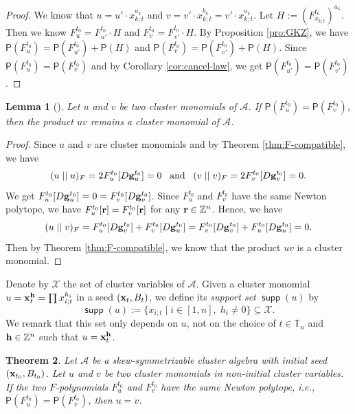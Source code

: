 \documentclass[10pt]{amsart}
\newtheorem{theorem}{Theorem}[section]
\newtheorem{lemma}[theorem]{Lemma}
\theoremstyle{definition}
\theoremstyle{remark}
\numberwithin{equation}{section}
\newcommand{\opname}[1]{\operatorname{\mathsf{#1}}}
\newcommand{\supp}{\opname{supp}}
\begin{document}
\begin{proof}
We know that $u=u'\cdot x_{k;t}^{a_k}$ and $v=v'\cdot x_{k;t}^{b_k}=v'\cdot x_{k;t}^{a_k}$. Let $H:=(F_{x_{k;t}}^{t_0})^{a_k}$. Then we know
 $F_u^{t_0}=F_{u'}^{t_0}\cdot H$ and $F_{v}^{t_0}=F_{v'}^{t_0}\cdot H$. By Proposition \ref{pro:GKZ}, we have $\mathsf P(F_u^{t_0})=\mathsf P(F_{u'}^{t_0})+\mathsf P(H)$ and $\mathsf P(F_{v}^{t_0})=\mathsf P(F_{v'}^{t_0})+\mathsf P(H)$. Since $\mathsf P(F_u^{t_0})=\mathsf P(F_{v}^{t_0})$ and by Corollary \ref{cor:cancel-law}, we get $\mathsf P(F_{u'}^{t_0})=\mathsf P(F_{v'}^{t_0})$.
\end{proof}


\begin{lemma}[{\cite[Corollary 4.21]{Cao-2023}}] \label{lem:uu1}
    Let $u$ and $v$ be two cluster monomials of $\mathcal A$.
  If $\mathsf P(F_u^{t_0})=\mathsf P(F_{v}^{t_0})$, then the product $uv$ remains a cluster monomial of $\mathcal A$.  
\end{lemma}

\begin{proof}
    Since $u$ and $v$ are cluster monomials and by Theorem \ref{thm:F-compatible}, we have
\[
(u\mid\mid u)_F=2F_u^{t_0}[D{\bf g}_u^{t_0}]=0\;\;\;\text{and}\;\;\;(v\mid\mid v)_F=2F_{v}^{t_0}[D{\bf g}_{v}^{t_0}]=0.
\]
We get $F_u^{t_0}[D{\bf g}_u^{t_0}]=0=F_{v}^{t_0}[D{\bf g}_{v}^{t_0}]$.
Since $F_u^{t_0}$ and $F_{v}^{t_0}$ have the same Newton polytope, we have $F_u^{t_0}[{\bf r}]=F_{v}^{t_0}[{\bf r}]$ for any ${\bf r}\in\mathbb Z^n$. Hence,
we have
\[
(u\mid\mid v)_F=F_u^{t_0}[D{\bf g}_{v}^{t_0}]+F_{v}^{t_0}[D{\bf g}_u^{t_0}]=F_{v}^{t_0}[D{\bf g}_{v}^{t_0}]+F_u^{t_0}[D{\bf g}_u^{t_0}]=0.
\]
Then by Theorem \ref{thm:F-compatible}, we know that the product $uv$ is  a cluster monomial. 
\end{proof}

Denote by $\mathcal X$ the set of  cluster variables of $\mathcal A$. Given a cluster monomial $u={\bf x}_t^{\bf h}=\prod x_{i;t}^{h_i}$ in a seed $({\bf x}_t, B_t)$, we define its {\em support set} $\supp(u)$ by
\[\supp(u):=\{x_{i;t}\mid i\in[1,n], \;h_i\neq 0\}\subseteq \mathcal X.\] We remark that this set only depends on $u$, not on the choice of $t\in\mathbb T_n$ and ${\bf h}\in\mathbb Z^{n}$ such that $u={\bf x}_t^{\bf h}$.
   

\begin{theorem}
Let $\mathcal A$ be a skew-symmetrizable cluster algebra with initial seed $({\bf x}_{t_0}, B_{t_0})$. Let $u$ and $v$ be two cluster monomials in non-initial cluster variables.
 If the two $F$-polynomials $F_u^{t_0}$ and $F_{v}^{t_0}$ have the same Newton polytope, i.e., $\mathsf P(F_u^{t_0})=\mathsf P(F_{v}^{t_0})$, then $u=v$.   
\end{theorem}
\end{document}
